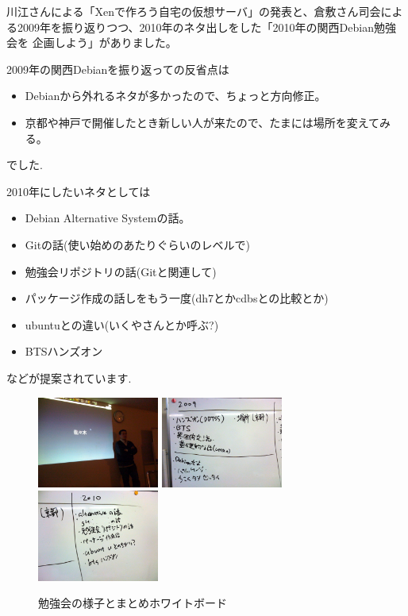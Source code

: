 \documentclass[mingoth,a4paper]{jsarticle}
\begin{document}
川江さんによる「Xenで作ろう自宅の仮想サーバ」の発表と、倉敷さん司会によ
る2009年を振り返りつつ、2010年のネタ出しをした「2010年の関西Debian勉強会を
企画しよう」がありました。

2009年の関西Debianを振り返っての反省点は
\begin{itemize}
 \item Debianから外れるネタが多かったので、ちょっと方向修正。
 \item 京都や神戸で開催したとき新しい人が来たので、たまには場所を変えてみる。
\end{itemize}
でした. 

2010年にしたいネタとしては
\begin{itemize}
 \item Debian Alternative Systemの話。
 \item Gitの話(使い始めのあたりぐらいのレベルで)
 \item 勉強会リポジトリの話(Gitと関連して)
 \item パッケージ作成の話しをもう一度(dh7とかcdbsとの比較とか)
 \item ubuntuとの違い(いくやさんとか呼ぶ?)
 \item BTSハンズオン
\end{itemize}
などが提案されています. 


\begin{figure}[h]
 \begin{center}
 \includegraphics[width=4cm]{image201002/kansaimeeting1.jpg}
 \includegraphics[width=4cm]{image201002/kansaimeeting2.jpg}
 \includegraphics[width=4cm]{image201002/kansaimeeting3.jpg}
 \caption{勉強会の様子とまとめホワイトボード}
 \end{center}
\end{figure}
\end{document}
